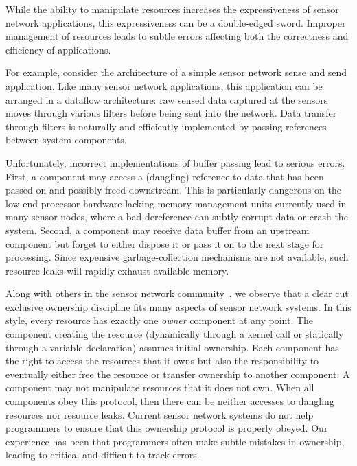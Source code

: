 While the ability to manipulate resources increases the expressiveness of
sensor network applications, this expressiveness can be a double-edged
sword.  
%
Improper management of resources leads to subtle errors affecting both the
correctness and efficiency of applications.



For example, consider the architecture of a simple sensor network sense and
send application.  
%
Like many sensor network applications, this application can be arranged in
a dataflow architecture:  raw sensed data captured at the sensors moves
through various filters before being sent into the network.  
%
Data transfer through filters is naturally and efficiently implemented by
passing references between system components.



Unfortunately, incorrect implementations of buffer passing lead to serious
errors.  
%
First, a component may access a (dangling) reference to data that has been
passed on and possibly freed downstream. 
%
This is particularly dangerous on the low-end processor hardware lacking memory
management units currently used in many sensor nodes, where a bad dereference
can subtly corrupt data or crash the system. 
%
Second, a component may receive data buffer from an upstream component but
forget to either dispose it or pass it on to the next stage for processing.
%
Since expensive garbage-collection mechanisms are not available, such
resource leaks will rapidly exhaust available memory.



Along with others in the sensor network community~\cite{07interface,XXX}, we
observe that a clear cut exclusive ownership discipline fits many aspects of
sensor network systems.
%
In this style, every resource has exactly one {\em owner} component at any
point.  
%
The component creating the resource (dynamically through a kernel call or
statically through a variable declaration) assumes initial ownership.  
%
Each component has the right to access the resources that it owns but also the
responsibility to eventually either free the resource or transfer ownership to
another component.  
%
A component may not manipulate resources that it does not own.  
%
When all components obey this protocol, then there can be neither accesses to
dangling resources nor resource leaks.
%
Current sensor network systems do not help programmers to ensure that this
ownership protocol is properly obeyed.  
%
Our experience has been that programmers often make subtle mistakes in
ownership, leading to critical and difficult-to-track errors.  



